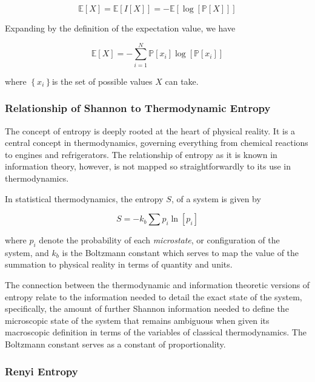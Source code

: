 \documentclass[english]{article}
\begin{document}
\begin{equation}
\mathbb{E}\left[X\right]=\mathbb{E}\left[I\left[X\right]\right]=-\mathbb{E}\left[\log\left[\mathbb{P}\left[X\right]\right]\right]
\end{equation}


Expanding by the definition of the expectation value, we have

\begin{equation}
\mathbb{E}\left[X\right]=-\sum_{i=1}^{N}\mathbb{P}\left[x_{i}\right]\log\left[\mathbb{P}\left[x_{i}\right]\right]
\end{equation}


where $\left\{ x_{i}\right\} $is the set of possible values $X$
can take.


\subsubsection{Relationship of Shannon to Thermodynamic Entropy}

The concept of entropy is deeply rooted at the heart of physical reality.
It is a central concept in thermodynamics, governing everything from
chemical reactions to engines and refrigerators. The relationship
of entropy as it is known in information theory, however, is not mapped
so straightforwardly to its use in thermodynamics.

In statistical thermodynamics, the entropy $S$, of a system is given
by

\begin{equation}
S=-k_{b}\sum p_{i}\ln\left[p_{i}\right]
\end{equation}


where $p_{i}$ denote the probability of each \emph{microstate}, or
configuration of the system, and $k_{b}$ is the Boltzmann constant
which serves to map the value of the summation to physical reality
in terms of quantity and units.

The connection between the thermodynamic and information theoretic
versions of entropy relate to the information needed to detail the
exact state of the system, specifically, the amount of further Shannon
information needed to define the microscopic state of the system that
remains ambiguous when given its macroscopic definition in terms of
the variables of classical thermodynamics. The Boltzmann constant
serves as a constant of proportionality.


\subsubsection{Renyi Entropy}
\end{document}
